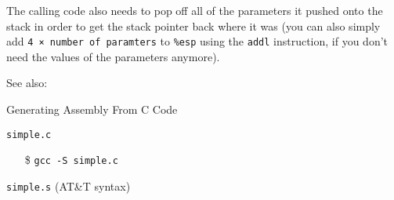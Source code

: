 The calling code also needs to pop off all of the parameters it pushed onto the stack in
order to get the stack pointer back where it was (you can also simply add \texttt{4 × number
  of paramters} to \texttt{\%esp} using the \texttt{addl} instruction, if you don't need the
values of the parameters anymore). 

See also: 

\begin{frame}{Generating Assembly From C Code}
  \begin{minipage}{.22\linewidth}
    \begin{block}{\texttt{simple.c}}
      \begin{center}
      \end{center}
    \end{block}
    \begin{small}
      \begin{itemize}
      \item[\$] \texttt{gcc -S simple.c}
      \end{itemize}
    \end{small}
  \end{minipage}\qquad
  \begin{minipage}{.7\linewidth}
    \begin{block}{\texttt{simple.s} \scriptsize{(AT\&T syntax)}}
      \begin{center}
      \end{center}
    \end{block}
  \end{minipage}
\end{frame}

